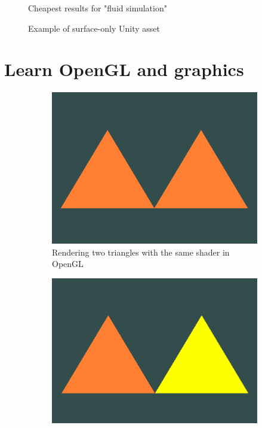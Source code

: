 \documentclass[12pt]{article}
\newcommand{\wideimage}[2][]{%
  \makebox[\textwidth][c]{\texttt{[image: \#2]}}%
}
\begin{document}
    \begin{figure}[H]
        \wideimage[width=1.4\textwidth]{unityStore2.png}
        \caption{Cheapest results for "fluid simulation" \cite{unityasset}}
    \end{figure}

    \begin{figure}[H]
        \wideimage[]{stylizedWaterURP.png}
        \caption{Example of surface-only Unity asset \cite{stylized}}
    \end{figure}

    \section{Learn OpenGL and graphics}

    \begin{figure}[H]
        \centering
        \begin{subfigure}[b]{0.45\textwidth}
            \centering
            \includegraphics[width=\textwidth]{openGL2Triangles.png}
            \caption{Rendering two triangles with the same shader in OpenGL}
        \end{subfigure}
        \hfill
        \begin{subfigure}[b]{0.45\textwidth}
            \centering
            \includegraphics[width=\textwidth]{openGL2Triangles2Shaders.png}

\end{subfigure}
\end{figure}
\end{document}
